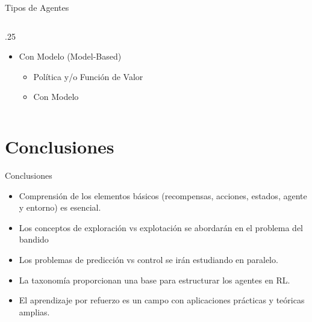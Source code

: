 \documentclass[10pt, envcountsect, handout, aspectratio=1610, hyperref={hypertexnames=true}]{beamer}
\begin{document}
\begin{frame}{Tipos de Agentes}
\begin{columns}
\begin{column}{.25\textwidth}
\begin{itemize}
\item {Con Modelo (Model-Based)}
    \begin{itemize}
        \item Política y/o Función de Valor
        \item Con Modelo
    \end{itemize}
\end{itemize}
\end{column}
\end{columns}



\end{frame}




\section{Conclusiones}

\begin{frame}{Conclusiones}
	
\begin{itemize}
	\item Comprensión de los elementos básicos (recompensas, acciones, estados, agente y entorno) es esencial.
	\item Los conceptos de exploración vs explotación se abordarán en el problema del bandido
	
	\item Los problemas de predicción vs control se irán estudiando en paralelo.
	
	\item La taxonomía proporcionan una base para estructurar los agentes  en RL.
	
	\item El aprendizaje por refuerzo es un campo con aplicaciones prácticas y teóricas amplias.
\end{itemize}
	
	
\end{frame}





\end{document}
